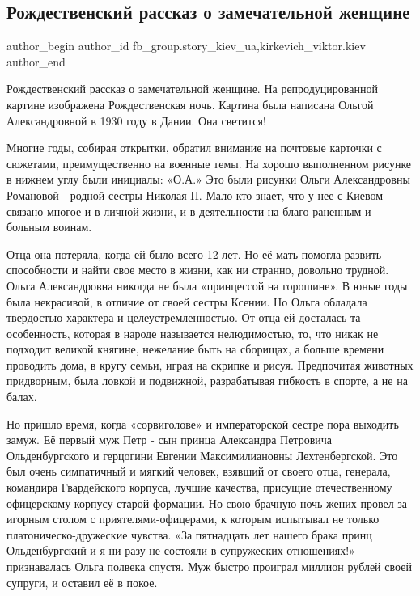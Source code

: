  
 
 
 
 
 
\subsection{Рождественский рассказ о замечательной женщине}
\label{sec:07_01_2022.fb.fb_group.story_kiev_ua.2.olga_aleksandrovna}
 
\ifcmt
 author_begin
   author_id fb_group.story_kiev_ua,kirkevich_viktor.kiev
 author_end
\fi

Рождественский рассказ о замечательной женщине. На репродуцированной картине
изображена Рождественская ночь. Картина была написана Ольгой Александровной в
1930 году в Дании. Она светится!

Многие годы, собирая открытки, обратил внимание на почтовые карточки с
сюжетами, преимущественно на военные темы. На хорошо выполненном рисунке в
нижнем углу были инициалы: «О.А.» Это были рисунки Ольги Александровны
Романовой - родной сестры Николая II. Мало кто знает, что у нее с Киевом
связано многое и в личной жизни, и в деятельности на благо раненным и больным
воинам.

Отца она потеряла, когда ей было всего 12 лет. Но её мать помогла развить
способности и найти свое место в жизни, как ни странно, довольно трудной. Ольга
Александровна никогда не была «принцессой на горошине». В юные годы была
некрасивой, в отличие от своей сестры Ксении. Но Ольга обладала твердостью
характера и целеустремленностью. От отца ей досталась та особенность, которая в
народе называется нелюдимостью, то, что никак не подходит великой княгине,
нежелание быть на сборищах, а больше времени проводить дома, в кругу семьи,
играя на скрипке и рисуя. Предпочитая животных придворным, была ловкой и
подвижной, разрабатывая гибкость в спорте, а не на балах. 

Но пришло время, когда «сорвиголове» и императорской сестре пора выходить
замуж. Её первый муж Петр - сын принца Александра Петровича Ольденбургского и
герцогини Евгении Максимилиановны Лехтенбергской. Это был очень симпатичный и
мягкий человек, взявший от своего отца, генерала, командира Гвардейского
корпуса, лучшие качества, присущие отечественному офицерскому корпусу старой
формации. Но свою брачную ночь жених провел за игорным столом с
приятелями-офицерами, к которым испытывал не только платоническо-дружеские
чувства. «За пятнадцать лет нашего брака принц Ольденбургский и я ни разу не
состояли в супружеских отношениях!» - признавалась Ольга полвека спустя. Муж
быстро проиграл миллион рублей своей супруги, и оставил её в покое. 

